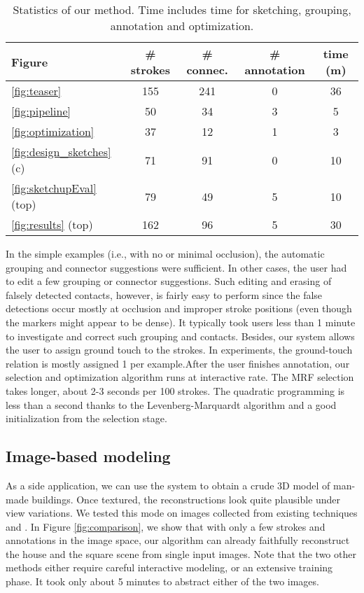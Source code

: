 \begin{table} \vnudge\centering
\small
\caption{Statistics of our method. %
Time includes time for sketching, grouping, annotation and optimization.
} \label{tbl:statistics}
\begin{tabular}{l|c|c|c|c}
\hline
  Figure & \# strokes & \# connec. & \# annotation & time (m) \\
  \hline
\ref{fig:teaser} & 155 & 241 & 0 & 36 \\
\ref{fig:pipeline} & 50 & 34 & 3 &  5 \\
\ref{fig:optimization} &  37 & 12 & 1 & 3\\
\ref{fig:design_sketches} (c) & 71 & 91 & 0 & 10 \\
\ref{fig:sketchupEval} (top) & 79 & 49 & 5 & 10 \\
\ref{fig:results} (top) &  162 & 96  & 5 & 30\\
\hline
\end{tabular}
\end{table}


In the simple examples (i.e., with no or minimal occlusion), the automatic grouping and connector suggestions were sufficient. In other cases, the user had to edit a few grouping or connector suggestions. Such editing and erasing of falsely detected contacts, however, is fairly easy to perform since the false detections occur mostly at occlusion and improper stroke positions (even though the markers might appear to be dense). It typically took users less than 1 minute to investigate and correct such grouping and contacts. Besides, our system allows the user to assign ground touch to the strokes. In experiments, the ground-touch relation is mostly assigned 1 per example.After the user finishes annotation, our selection and optimization algorithm runs at interactive rate. The MRF selection takes longer, about 2-3 seconds per 100 strokes. The quadratic programming is less than a second thanks to the Levenberg-Marquardt algorithm and a good initialization from the selection stage.

\subsection{Image-based modeling}

As a side application, we can use the system to obtain a crude 3D model of man-made buildings. Once textured, the reconstructions look quite plausible under view variations. We tested this mode on images collected from existing techniques \cite{Sinha:2008:IAM} and \cite{SaxenaSN09}. In Figure \ref{fig:comparison}, we show that with only a few strokes and annotations in the image space, our algorithm can already faithfully reconstruct the house and the square scene from single input images. Note that the two other methods either require careful interactive modeling, or an extensive training phase. It took only about 5 minutes to abstract either of the two images.


